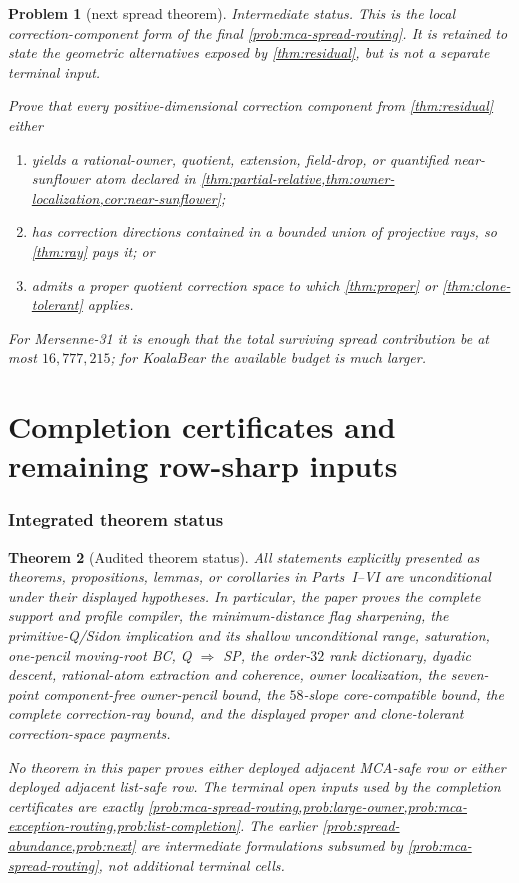 \documentclass[11pt,a4paper]{amsart}
\numberwithin{equation}{section}
\newtheorem{theorem}{Theorem}[section]
\newtheorem{problem}[theorem]{Problem}
\theoremstyle{remark}
\begin{document}
\begin{problem}[next spread theorem]\label{prob:next}
\emph{Intermediate status.}
This is the local correction-component form of the final
\cref{prob:mca-spread-routing}.  It is retained to state the geometric
alternatives exposed by \cref{thm:residual}, but is not a separate terminal
input.

Prove that every positive-dimensional correction component from \cref{thm:residual} either
\begin{enumerate}[label=\textup{(\alph*)}]
\item yields a rational-owner, quotient, extension, field-drop, or quantified near-sunflower atom declared in \cref{thm:partial-relative,thm:owner-localization,cor:near-sunflower};
\item has correction directions contained in a bounded union of projective rays, so \cref{thm:ray} pays it; or
\item admits a proper quotient correction space to which \cref{thm:proper} or \cref{thm:clone-tolerant} applies.
\end{enumerate}
For Mersenne-31 it is enough that the total surviving spread contribution be at most $16{,}777{,}215$; for KoalaBear the available budget is much larger.
\end{problem}


\part{Completion certificates and remaining row-sharp inputs}
\label{part:completion}

\section{Integrated theorem status}
\label{sec:status-and-obligations}
\begin{theorem}[Audited theorem status]\label{thm:audited-status}
All statements explicitly presented as theorems, propositions, lemmas, or corollaries in Parts~I--VI are unconditional under their displayed hypotheses.  In particular, the paper proves the complete support and profile compiler, the minimum-distance flag sharpening, the primitive-Q/Sidon implication and its shallow unconditional range, saturation, one-pencil moving-root BC, Q $\Rightarrow$ SP, the order-$32$ rank dictionary, dyadic descent, rational-atom extraction and coherence, owner localization, the seven-point component-free owner-pencil bound, the $58$-slope core-compatible bound, the complete correction-ray bound, and the displayed proper and clone-tolerant correction-space payments.

No theorem in this paper proves either deployed adjacent MCA-safe row or
either deployed adjacent list-safe row.  The terminal open inputs used by the
completion certificates are exactly
\cref{prob:mca-spread-routing,prob:large-owner,prob:mca-exception-routing,prob:list-completion}.
The earlier \cref{prob:spread-abundance,prob:next} are intermediate
formulations subsumed by \cref{prob:mca-spread-routing}, not additional
terminal cells.
\end{theorem}
\end{document}
